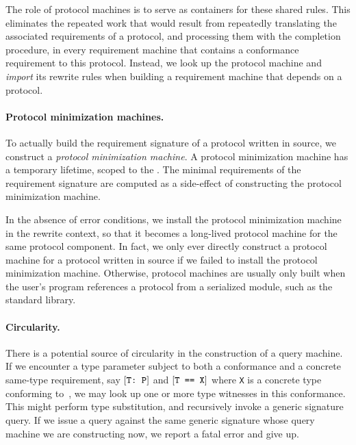 \documentclass[../generics]{subfiles}
\begin{document}
The role of protocol machines is to serve as containers for these shared rules. This eliminates the repeated work that would result from repeatedly translating the associated requirements of a protocol, and processing them with the completion procedure, in every requirement machine that contains a conformance requirement to this protocol. Instead, we look up the protocol machine and \emph{import} its rewrite rules when building a requirement machine that depends on a protocol.

\paragraph{Protocol minimization machines.}
To actually build the requirement signature of a protocol written in source, we construct a \emph{protocol minimization machine}. A protocol minimization machine has a temporary lifetime, scoped to the . The minimal requirements of the requirement signature are computed as a side-effect of constructing the protocol minimization machine.

In the absence of error conditions, we install the protocol minimization machine in the rewrite context, so that it becomes a long-lived protocol machine for the same protocol component. In fact, we only ever directly construct a protocol machine for a protocol written in source if we failed to install the protocol minimization machine. Otherwise, protocol machines are usually only built when the user's program references a protocol from a serialized module, such as the standard library.

\paragraph{Circularity.}
There is a potential source of circularity in the construction of a query machine. If we encounter a type parameter subject to both a conformance and a concrete same-type requirement, say $[\texttt{T:~P}]$ and $[\texttt{T == X}]$ where \texttt{X} is a concrete type conforming to~\tP, we may look up one or more type witnesses in this conformance. This might perform type substitution, and recursively invoke a generic signature query. If we issue a query against the same generic signature whose query machine we are constructing now, we report a fatal error and give up.
\end{document}
